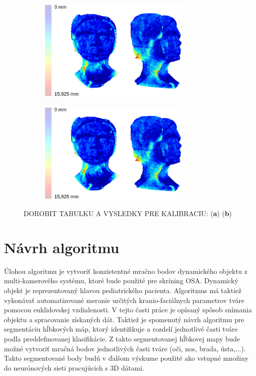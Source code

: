 \begin{figure}[h]
	\centering
	\begin{subfigure}[b]{0.48\textwidth}
		\centering
		\includegraphics[height=5cm]{figures/calibration_hausdorff_multi.png}
		\caption{}
		\label{fig:calib:multi:haus:uncalib}
	\end{subfigure}
	\hfill
	\begin{subfigure}[b]{0.48\textwidth}
		\centering
		\includegraphics[height=5cm]{figures/calibration_hausdorff_multi.png}
		\caption{}
		\label{fig:calib:multi:haus:calib}
	\end{subfigure}
	\caption{DOROBIT TABULKU A VYSLEDKY PRE KALIBRACIU: (\textbf{a})  (\textbf{b})}
	\label{fig:calib:multi:haus}
\end{figure}

\section{Návrh algoritmu}

Úlohou algoritmu je vytvoriť konzistentné mračno bodov dynamického objektu z multi-kamerového systému, ktoré bude použité pre skríning OSA. Dynamický objekt je reprezentovaný hlavou pediatrického pacienta. Algoritmus má taktiež vykonávať automatizované meranie určitých kranio-faciálnych parametrov tváre pomocou euklidovskej vzdialenosti. V tejto časti práce je opísaný spôsob snímania objektu a spracovanie získaných dát. Taktiež je spomenutý návrh algoritmu pre segmentáciu hĺbkových máp, ktorý identifikuje a rozdelí jednotlivé časti tváre podľa preddefinovanej klasifikácie.
Z takto segmentovanej hĺbkovej mapy bude možné vytvoriť mračná bodov jednotlivých časti tváre (oči, nos, brada, ústa,...). Takto segmentované body budú v ďalšom výskume použité ako vstupné množiny do neurónových sieti pracujúcich s 3D dátami. \newline

